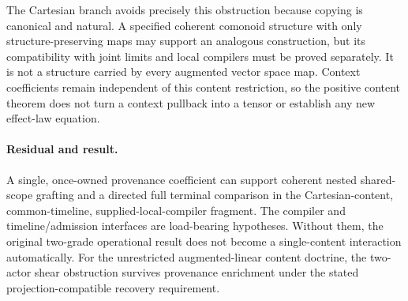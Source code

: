 \documentclass[11pt]{article}
\begin{document}
The Cartesian branch avoids precisely this obstruction because copying is canonical and natural. A specified coherent comonoid structure with only structure-preserving maps may support an analogous construction, but its compatibility with joint limits and local compilers must be proved separately. It is not a structure carried by every augmented vector space map. Context coefficients remain independent of this content restriction, so the positive content theorem does not turn a context pullback into a tensor or establish any new effect-law equation.

\paragraph{Residual and result.} A single, once-owned provenance coefficient can support coherent nested shared-scope grafting and a directed full terminal comparison in the Cartesian-content, common-timeline, supplied-local-compiler fragment. The compiler and timeline/admission interfaces are load-bearing hypotheses. Without them, the original two-grade operational result does not become a single-content interaction automatically. For the unrestricted augmented-linear content doctrine, the two-actor shear obstruction survives provenance enrichment under the stated projection-compatible recovery requirement.
\end{document}
